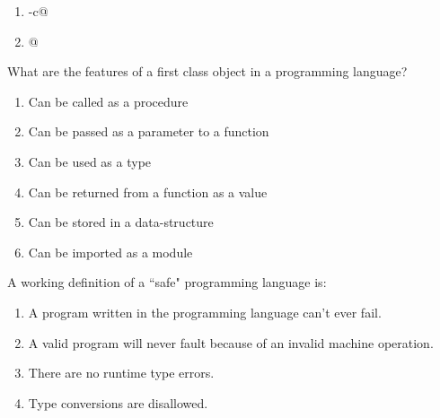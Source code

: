 \documentclass[addpoints,11pt]{exam}
\begin{document}
\begin{questions}
\begin{enumerate}
\item \lstinline@ab-c@
\item {}@
\end{enumerate}\question What are the features of a first class object in a programming language?
\begin{enumerate}
\item Can be called as a procedure
\item Can be passed as a parameter to a function
\item Can be used as a type
\item Can be returned from a function as a value
\item Can be stored in a data-structure
\item Can be imported as a module
\end{enumerate}\question A working definition of a ``safe" programming language is:
\begin{enumerate}
\item A program written in the programming language can't ever fail.
\item A valid program will never fault because of an invalid machine operation.
\item There are no runtime type errors.
\item Type conversions are disallowed.
\end{enumerate}\end{questions}
\end{document}
